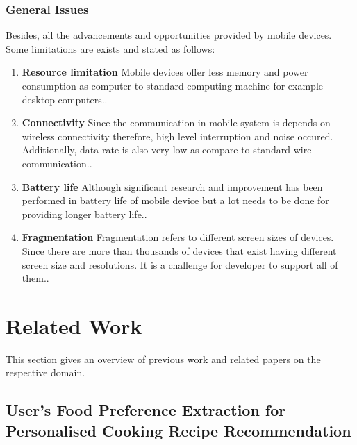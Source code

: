 \subsubsection{General Issues}

Besides, all the advancements and opportunities provided by mobile devices. Some limitations are exists and stated as follows:

\begin{enumerate}
	
	\item \textbf{Resource limitation}\newline 
	Mobile devices offer less memory and power consumption as computer to standard computing machine for example desktop computers.\cite{ricci2010mobile}. 
	
	\item \textbf{Connectivity}\newline 
	Since the communication in mobile system is depends on wireless connectivity therefore, high level interruption and noise occured. Additionally, data rate is also very low as compare to standard wire communication.\cite{ricci2010mobile}.
	
	\item \textbf{Battery life}\newline
	 Although significant research and improvement has been performed in battery life of mobile device but a lot needs to be done for providing longer battery life.\cite{ricci2010mobile}.
	
	\item \textbf{Fragmentation}\newline 
		Fragmentation refers to different screen sizes of devices. Since there are more than thousands of devices that exist having different screen size and resolutions. It is a challenge for developer to support all of them.\cite{ricci2010mobile}.
\end{enumerate}

\section{Related Work}
This section gives an overview of previous work and related papers on the respective domain.

\subsection{User's Food Preference Extraction for Personalised Cooking Recipe Recommendation}

